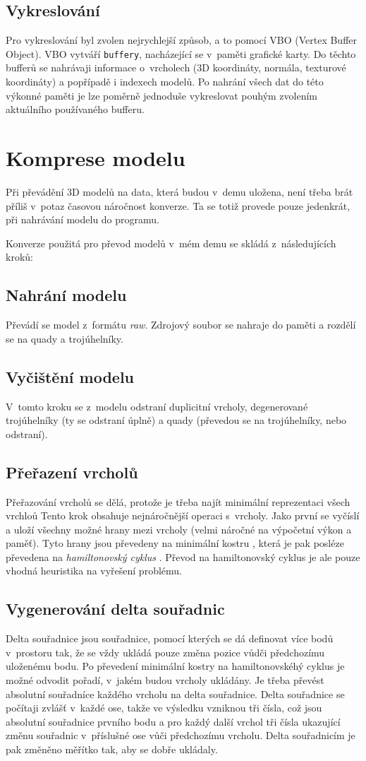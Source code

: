 \subsection {Vykreslování}
Pro vykreslování byl zvolen nejrychlejší způsob, a to pomocí VBO (Vertex Buffer Object).
VBO vytváří \texttt{buffery}, nacházející se v~paměti grafické karty.
Do těchto bufferů se nahrávaji informace o~vrcholech (3D koordináty, normála, texturové koordináty) a popřípadě i indexech modelů.
Po nahrání všech dat do této výkonné paměti je lze poměrně jednoduše vykreslovat pouhým zvolením aktuálního používaného bufferu.

\section {Komprese modelu} \label{komprese}
Při převádění 3D modelů na data, která budou v~demu uložena, není třeba brát příliš v~potaz časovou náročnost konverze.
Ta se totiž provede pouze jedenkrát, při nahrávání modelu do programu.

Konverze použitá pro převod modelů v~mém demu se skládá z~následujících kroků:

\subsection {Nahrání modelu}
Převádí se model z~formátu \emph{raw}. Zdrojový soubor se nahraje do paměti a rozdělí se na quady a trojúhelníky.
\subsection {Vyčištění modelu}
V~tomto kroku se z~modelu odstraní duplicitní vrcholy, degenerované trojúhelníky (ty se odstraní úplně) a quady (převedou se na trojúhelníky, nebo odstraní).
\subsection {Přeřazení vrcholů}
Přeřazování vrcholů se dělá, protože je třeba najít minimální reprezentaci všech vrchloů
Tento krok obsahuje nejnáročnější operaci s~vrcholy.
Jako první se vyčíslí a uloží všechny možné hrany mezi vrcholy (velmi náročné na výpočetní výkon a paměť).
Tyto hrany jsou převedeny na minimální kostru \cite{minimumSpanningTree}, která je pak posléze převedena na \emph{hamiltonovský cyklus} \cite{hamiltonianPath}.
Převod na hamiltonovský cyklus je ale pouze vhodná heuristika na vyřešení problému.
\subsection {Vygenerování delta souřadnic}
Delta souřadnice jsou souřadnice, pomocí kterých se dá definovat více bodů v~prostoru tak, že se vždy ukládá pouze změna pozice vůdči předchozímu uloženému bodu.
Po převedení minimální kostry na hamiltonovskéhý cyklus je možné odvodit pořadí, v~jakém budou vrcholy ukládány.
Je třeba převést absolutní souřadníce každého vrcholu na delta souřadnice.
Delta souřadnice se počítaji zvlášť v~každé ose, takže ve výsledku vzniknou tři čísla, což jsou absolutní souřadnice prvního bodu a pro každý další vrchol tři čísla ukazující změnu souřadnic v~příslušné ose vůči předchozímu vrcholu.
Delta souřadnicím je pak změněno měřítko tak, aby se dobře ukládaly.
